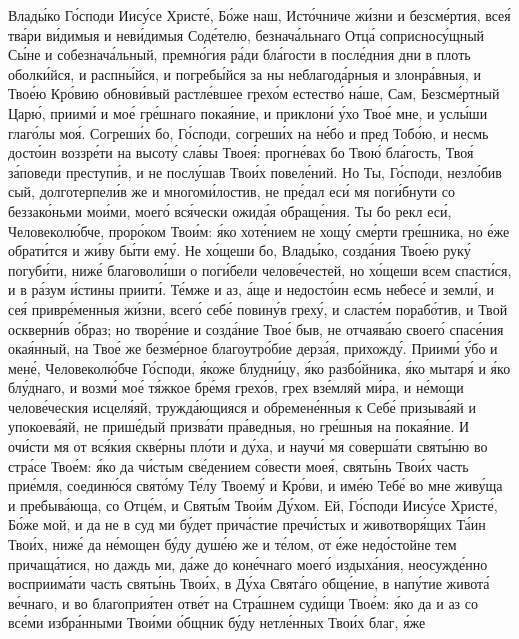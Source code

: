 \begin{mymulticols}
Влад\'{ы}ко Г\'{о}споди Иис\'{у}се Христ\'{е}, Б\'{о}же наш, Ист\'{о}чниче ж\'{и}зни и безсм\'{е}ртия, все\'{я} тв\'{а}ри в\'{и}димыя и нев\'{и}димыя Сод\'{е}телю, безнач\'{а}льнаго Отц\'{а} соприснос\'{у}щный С\'{ы}не и собезнач\'{а}льный, премн\'{о}гия р\'{а}ди бл\'{а}гости в посл\'{е}дния дни в плоть оболк\'{и}йся, и распн\'{ы}йся, и погреб\'{ы}йся за ны неблагод\'{а}рныя и злонр\'{а}вныя, и Тво\'{е}ю Кр\'{о}вию обнов\'{и}вый растл\'{е}вшее грех\'{о}м естеств\'{о} н\'{а}ше, Сам, Безсм\'{е}ртный Цар\'{ю}, приим\'{и} и мо\'{е} гр\'{е}шнаго пока\'{я}ние, и приклон\'{и} \'{у}хо Тво\'{е} мне, и усл\'{ы}ши глаг\'{о}лы мо\'{я}. Согреш\'{и}х бо, Г\'{о}споди, согреш\'{и}х на н\'{е}бо и пред Тоб\'{о}ю, и несмь дост\'{о}ин воззр\'{е}ти на высот\'{у} сл\'{а}вы Твое\'{я}: прогн\'{е}вах бо Тво\'{ю} бл\'{а}гость, Тво\'{я} з\'{а}поведи преступ\'{и}в, и не посл\'{у}шав Тво\'{и}х повел\'{е}ний. Но Ты, Г\'{о}споди, незл\'{о}бив сый, долготерпел\'{и}в же и многом\'{и}лостив, не пр\'{е}дал ес\'{и} мя пог\'{и}бнути со беззак\'{о}ньми мо\'{и}ми, моег\'{о} вс\'{я}чески ожид\'{а}я обращ\'{е}ния. Ты бо рекл ес\'{и}, Человекол\'{ю}бче, прор\'{о}ком Тво\'{и}м: \'{я}ко хот\'{е}нием не хощ\'{у} см\'{е}рти гр\'{е}шника, но \'{е}же обрат\'{и}тся и ж\'{и}ву б\'{ы}ти ем\'{у}. Не х\'{о}щеши бо, Влад\'{ы}ко, созд\'{а}ния Тво\'{е}ю рук\'{у} погуб\'{и}ти, ниж\'{е} благовол\'{и}ши о пог\'{и}бели челов\'{е}честей, но х\'{о}щеши всем спаст\'{и}ся, и в р\'{а}зум \'{и}стины приит\'{и}. Т\'{е}мже и аз, \'{а}ще и недост\'{о}ин есмь небес\'{е} и земл\'{и}, и се\'{я} привр\'{е}менныя ж\'{и}зни, всег\'{о} себ\'{е} повин\'{у}в грех\'{у}, и сласт\'{е}м пораб\'{о}тив, и Твой оскверн\'{и}в \'{о}браз; но твор\'{е}ние и созд\'{а}ние Тво\'{е} быв, не отчаяв\'{а}ю своег\'{о} спас\'{е}ния ока\'{я}нный, на Тво\'{е} же безм\'{е}рное благоутр\'{о}бие дерз\'{а}я, прихожд\'{у}. Приим\'{и} \'{у}бо и мен\'{е}, Человекол\'{ю}бче Г\'{о}споди, \'{я}коже блудн\'{и}цу, \'{я}ко разб\'{о}йника, \'{я}ко мытар\'{я} и \'{я}ко бл\'{у}днаго, и возм\'{и} мо\'{е} т\'{я}жкое бр\'{е}мя грех\'{о}в, грех вз\'{е}мляй м\'{и}ра, и н\'{е}мощи челов\'{е}ческия исцел\'{я}яй, тружд\'{а}ющияся и обремен\'{е}нныя к Себ\'{е} призыв\'{а}яй и упокоев\'{а}яй, не приш\'{е}дый призв\'{а}ти пр\'{а}ведныя, но гр\'{е}шныя на пока\'{я}ние. И оч\'{и}сти мя от вс\'{я}кия скв\'{е}рны пл\'{о}ти и д\'{у}ха, и науч\'{и} мя соверш\'{а}ти свят\'{ы}ню во стр\'{а}се Тво\'{е}м: \'{я}ко да ч\'{и}стым св\'{е}дением с\'{о}вести мое\'{я}, свят\'{ы}нь Тво\'{и}х часть при\'{е}мля, соедин\'{ю}ся свят\'{о}му Т\'{е}лу Твоем\'{у} и Кр\'{о}ви, и им\'{е}ю Теб\'{е} во мне жив\'{у}ща и пребыв\'{а}юща, со Отц\'{е}м, и Свят\'{ы}м Тво\'{и}м Д\'{у}хом. Ей, Г\'{о}споди Иис\'{у}се Христ\'{е}, Б\'{о}же мой, и да не в суд ми б\'{у}дет прич\'{а}стие преч\'{и}стых и животвор\'{я}щих Т\'{а}ин Тво\'{и}х, ниж\'{е} да н\'{е}мощен б\'{у}ду душ\'{е}ю же и т\'{е}лом, от \'{е}же нед\'{о}стойне тем причащ\'{а}тися, но даждь ми, д\'{а}же до кон\'{е}чнаго моег\'{о} издых\'{а}ния, неосужд\'{е}нно восприим\'{а}ти часть свят\'{ы}нь Тво\'{и}х, в Д\'{у}ха Свят\'{а}го общ\'{е}ние, в нап\'{у}тие живот\'{а} в\'{е}чнаго, и во благопри\'{я}тен отв\'{е}т на Стр\'{а}шнем суд\'{и}щи Тво\'{е}м: \'{я}ко да и аз со вс\'{е}ми избр\'{а}нными Тво\'{и}ми \'{о}бщник б\'{у}ду нетл\'{е}нных Тво\'{и}х благ, \'{я}же 
\end{mymulticols}
